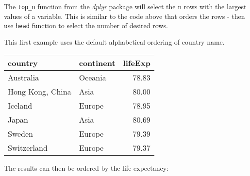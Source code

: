 \documentclass[
]{book}
\newenvironment{Shaded}{\begin{snugshade}}{\end{snugshade}}
\newcommand{\DataTypeTok}[1]{\textcolor[rgb]{0.13,0.29,0.53}{#1}}
\newcommand{\DecValTok}[1]{\textcolor[rgb]{0.00,0.00,0.81}{#1}}
\newcommand{\KeywordTok}[1]{\textcolor[rgb]{0.13,0.29,0.53}{\textbf{#1}}}
\newcommand{\NormalTok}[1]{#1}
\newcommand{\OperatorTok}[1]{\textcolor[rgb]{0.81,0.36,0.00}{\textbf{#1}}}
\newcommand{\StringTok}[1]{\textcolor[rgb]{0.31,0.60,0.02}{#1}}
\begin{document}
The \texttt{top\_n} function from the \emph{dplyr} package will select the n rows with the largest values of a variable. This is similar to the code above that orders the rows - then use \texttt{head} function to select the number of desired rows.

This first example uses the default alphabetical ordering of country name.

\begin{Shaded}
\end{Shaded}

\begin{tabular}{l|l|r}
\hline
country & continent & lifeExp\\
\hline
Australia & Oceania & 78.83\\
\hline
Hong Kong, China & Asia & 80.00\\
\hline
Iceland & Europe & 78.95\\
\hline
Japan & Asia & 80.69\\
\hline
Sweden & Europe & 79.39\\
\hline
Switzerland & Europe & 79.37\\
\hline
\end{tabular}

The results can then be ordered by the life expectancy:

\begin{Shaded}
\end{Shaded}
\end{document}
